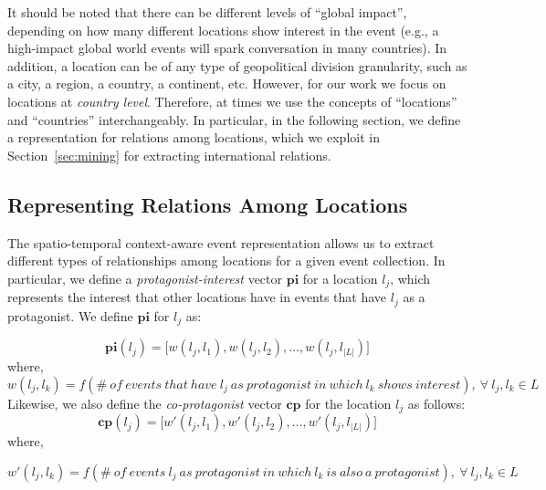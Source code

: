 It should be noted that there can be different levels of ``global impact'',
depending on how many different locations show interest in the event (e.g., a
high-impact global world events will spark conversation in many countries). 
%
In addition, a location can be of any type of geopolitical division granularity,
such as a city, a region, a country, a continent, etc. 
%
However, for our work we focus on locations at {\em country level}. 
%
Therefore, at times we use the concepts of ``locations'' and ``countries''
interchangeably.
%
In particular, in the following section, we define a representation for
relations among locations, which we exploit in Section~\ref{sec:mining} for
extracting international relations.




\subsection{Representing Relations Among Locations}\label{sec:relations}

The spatio-temporal context-aware event representation allows us to extract
different types of relationships among locations for a given event collection.
%
In particular, we define a {\em protagonist-interest} vector $\mathbf{pi}$ for a
location $l_j$, which represents the interest that other locations have in
events that have $l_j$ as a protagonist.  
%
We define $\mathbf{pi}$ for $l_j$ as:

\begin{equation} \label{eq:pi}
\mathbf{pi}(l_j) = \Big[ w(l_j,l_1),w(l_j,l_2),\ldots,w(l_j,l_{|L|}) \Big]
\end{equation}
%
\noindent where,
%
\begin{equation} \label{eq:pi-w}
w(l_j,l_k)=
f(\mathit{\#~of~events~that~have}~l_j~\mathit{as~protagonist}~\mathit{in~which}~l_k~\mathit{shows~interest}),~\forall~l_j,l_k \in L
\end{equation}
%
Likewise, we also define the {\em co-protagonist} vector $\mathbf{cp}$ for the
location $l_j$ as follows:
%
\begin{equation} \label{eq:cp}
\mathbf{cp}(l_j) = \Big[ w'(l_j,l_1),w'(l_j,l_2),\ldots,w'(l_j,l_{|L|}) \Big]
\end{equation}
%
\noindent where,

\begin{equation} \label{eq:cp-w}
w'(l_j,l_k)=
f(\mathit{\#~of~events}~l_j~\mathit{as~protagonist}~\mathit{in~which}~l_k~\mathit{is~also~a~protagonist}),~\forall~l_j,l_k \in L
\end{equation}

